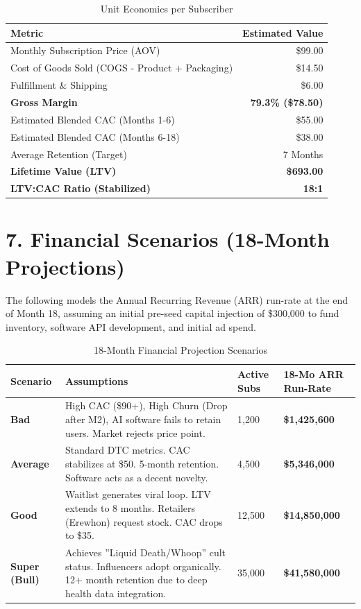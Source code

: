 \documentclass[11pt,a4paper]{article}
\begin{document}
\begin{table}[H]
\centering
\begin{tabularx}{\textwidth}{X r}
\toprule
\textbf{Metric} & \textbf{Estimated Value} \\
\midrule
Monthly Subscription Price (AOV) & \$99.00 \\
Cost of Goods Sold (COGS - Product + Packaging) & \$14.50 \\
Fulfillment \& Shipping & \$6.00 \\
\textbf{Gross Margin} & \textbf{79.3\% (\$78.50)} \\
\midrule
Estimated Blended CAC (Months 1-6) & \$55.00 \\
Estimated Blended CAC (Months 6-18) & \$38.00 \\
Average Retention (Target) & 7 Months \\
\textbf{Lifetime Value (LTV)} & \textbf{\$693.00} \\
\textbf{LTV:CAC Ratio (Stabilized)} & \textbf{18:1} \\
\bottomrule
\end{tabularx}
\caption{Unit Economics per Subscriber}
\end{table}

\section{7. Financial Scenarios (18-Month Projections)}

The following models the Annual Recurring Revenue (ARR) run-rate at the end of Month 18, assuming an initial pre-seed capital injection of \$300,000 to fund inventory, software API development, and initial ad spend.

\begin{table}[H]
\centering
\renewcommand{\arraystretch}{1.3} %
\begin{tabularx}{\textwidth}{l X X X}
\toprule
\textbf{Scenario} & \textbf{Assumptions} & \textbf{Active Subs} & \textbf{18-Mo ARR Run-Rate} \\
\midrule
\textbf{Bad} & 
High CAC (\$90+), High Churn (Drop after M2), AI software fails to retain users. Market rejects price point. & 
1,200 & 
\textbf{\$1,425,600} \\

\textbf{Average} & 
Standard DTC metrics. CAC stabilizes at \$50. 5-month retention. Software acts as a decent novelty. & 
4,500 & 
\textbf{\$5,346,000} \\

\textbf{Good} & 
Waitlist generates viral loop. LTV extends to 8 months. Retailers (Erewhon) request stock. CAC drops to \$35. & 
12,500 & 
\textbf{\$14,850,000} \\

\textbf{Super (Bull)} & 
Achieves ''Liquid Death/Whoop'' cult status. Influencers adopt organically. 12+ month retention due to deep health data integration. & 
35,000 & 
\textbf{\$41,580,000} \\
\bottomrule
\end{tabularx}
\caption{18-Month Financial Projection Scenarios}
\end{table}
\end{document}
